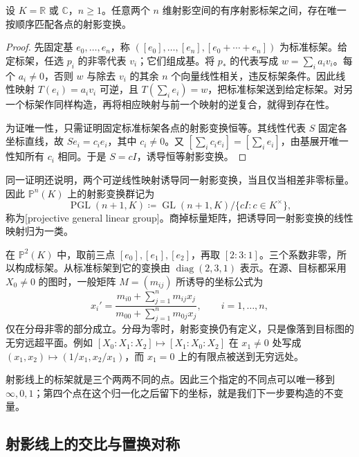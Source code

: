 \begin{theorem}\label{g1:thm:projective-frame}
	设 \(K=\mathbb R\) 或 \(\mathbb C\)，\(n\geq1\)。任意两个 \(n\) 维射影空间的有序射影标架之间，存在唯一按顺序匹配各点的射影变换。
\end{theorem}
\begin{proof}
	先固定基 \(e_0,\ldots,e_n\)，称 \(([e_0],\ldots,[e_n],[e_0+\cdots+e_n])\) 为标准标架。给定标架，任选 \(p_i\) 的非零代表 \(v_i\)；它们组成基。将 \(p_*\) 的代表写成 \(w=\sum_i a_i v_i\)。每个 \(a_i\ne0\)，否则 \(w\) 与除去 \(v_i\) 的其余 \(n\) 个向量线性相关，违反标架条件。因此线性映射 \(T(e_i)=a_i v_i\) 可逆，且 \(T(\sum_i e_i)=w\)，把标准标架送到给定标架。对另一个标架作同样构造，再将相应映射与前一个映射的逆复合，就得到存在性。

	为证唯一性，只需证明固定标准标架各点的射影变换恒等。其线性代表 \(S\) 固定各坐标直线，故 \(Se_i=c_i e_i\)，其中 \(c_i\ne0\)。又 \([\sum_i c_i e_i]=[\sum_i e_i]\)，由基展开唯一性知所有 \(c_i\) 相同。于是 \(S=cI\)，诱导恒等射影变换。
\end{proof}

同一证明还说明，两个可逆线性映射诱导同一射影变换，当且仅当相差非零标量。因此 \(\mathbb P^n(K)\) 上的射影变换群记为
\[
	\operatorname{PGL}(n+1,K)\coloneqq\operatorname{GL}(n+1,K)/\{cI:c\in K^\times\},
\]
称为[projective general linear group]。商掉标量矩阵，把诱导同一射影变换的线性映射归为一类。

\begin{example}\label{g1:exm:projective-frame-map}
	在 \(\mathbb P^2(K)\) 中，取前三点 \([e_0],[e_1],[e_2]\)，再取 \([2:3:1]\)。三个系数非零，所以构成标架。从标准标架到它的变换由 \(\operatorname{diag}(2,3,1)\) 表示。在源、目标都采用 \(X_0\ne0\) 的图时，一般矩阵 \(M=(m_{ij})\) 所诱导的坐标公式为
	\[
		x_i'=
		\frac{m_{i0}+\sum_{j=1}^n m_{ij}x_j}{m_{00}+\sum_{j=1}^n m_{0j}x_j},\qquad i=1,\ldots,n,
	\]
	仅在分母非零的部分成立。分母为零时，射影变换仍有定义，只是像落到目标图的无穷远超平面。例如 \([X_0:X_1:X_2]\mapsto[X_1:X_0:X_2]\) 在 \(x_1\ne0\) 处写成 \((x_1,x_2)\mapsto(1/x_1,x_2/x_1)\)，而 \(x_1=0\) 上的有限点被送到无穷远处。
\end{example}

射影线上的标架就是三个两两不同的点。因此三个指定的不同点可以唯一移到 \(\infty,0,1\)；第四个点在这个归一化之后留下的坐标，就是我们下一步要构造的不变量。

\subsection{射影线上的交比与置换对称}
\label{g1:subsec:0201:04}

